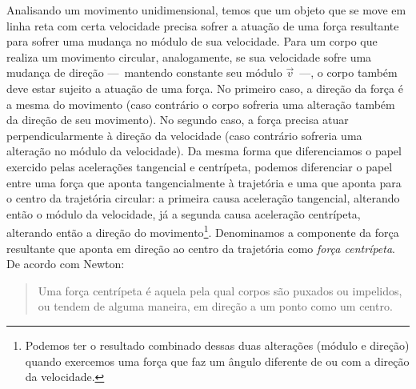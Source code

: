 Analisando um movimento unidimensional, temos que um objeto que se move em linha reta com certa velocidade precisa sofrer a atuação de uma força resultante para sofrer uma mudança no módulo de sua velocidade. Para um corpo que realiza um movimento circular, analogamente, se sua velocidade sofre uma mudança de direção ---~mantendo constante seu módulo $\vec{v}$~---, o corpo também deve estar sujeito a atuação de uma força. No primeiro caso, a direção da força é a mesma do movimento (caso contrário o corpo sofreria uma alteração também da direção de seu movimento). No segundo caso, a força precisa atuar perpendicularmente à direção da velocidade (caso contrário sofreria uma alteração no módulo da velocidade). Da mesma forma que diferenciamos o papel exercido pelas acelerações tangencial e centrípeta, podemos diferenciar o papel entre uma força que aponta tangencialmente à trajetória e uma que aponta para o centro da trajetória circular: a primeira causa aceleração tangencial, alterando então o módulo da velocidade, já a segunda causa aceleração centrípeta, alterando então a direção do movimento\footnote{Podemos ter o resultado combinado dessas duas alterações (módulo e direção) quando exercemos uma força que faz um ângulo diferente de  ou  com a direção da velocidade.}. Denominamos a componente da força resultante que aponta em direção ao centro da trajetória como \emph{força centrípeta}. De acordo com Newton:
\begin{quote}
    Uma força centrípeta é aquela pela qual corpos são puxados ou impelidos, ou tendem de alguma maneira, em direção a um ponto como um centro.
\end{quote}

